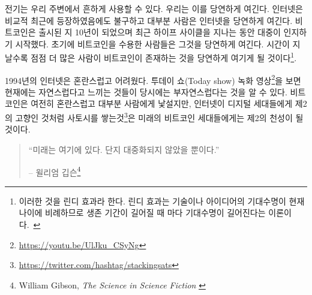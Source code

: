 \begin{comment}
Electricity has been around for a while now. We take it for granted. The
internet is quite a bit younger, but most people already take it for
granted as well. Bitcoin is ten years old and has entered public
consciousness during the last hype cycle. Only the earliest of adopters
take it for granted. As more time passes, more and more people will
recognize Bitcoin as something which simply is.\footnote{This is known as the
\textit{Lindy Effect}. The Lindy effect is a theory that the future life expectancy
of some non-perishable things like a technology or an idea is proportional to
their current age, so that every additional period of survival implies a longer
remaining life expectancy.~\cite{wiki:lindy}}
\end{comment}
전기는 우리 주변에서 흔하게 사용할 수 있다. 우리는 이를 당연하게 여긴다.
인터넷은 비교적 최근에 등장하였음에도 불구하고 대부분 사람은 인터넷을 당연하게 여긴다.
비트코인은 출시된 지 10년이 되었으며 최근 하이프 사이클을 지나는 동안 대중이 인지하기 시작했다.
초기에 비트코인을 수용한 사람들은 그것을 당연하게 여긴다. 
시간이 지날수록 점점 더 많은 사람이 비트코인이 존재하는 것을 당연하게 여기게 될 것이다\footnote{이러한 것을
	린디 효과라 한다. 린디 효과는 기술이나 아이디어의 기대수명이 현재 나이에 비례하므로 
	생존 기간이 길어질 때 마다 기대수명이 길어진다는 이론이다.~\cite{wiki:lindy}}.
	
\begin{comment}
In 1994, the internet was still confusing and unintuitive. Watching this old
recording of the \textit{Today
Show}\footnote{\url{https://youtu.be/UlJku_CSyNg}} makes it obvious that what
feels natural and intuitive now actually wasn't back then. Bitcoin is still
confusing and alien to most, but just like the internet is second nature for
digital natives, spending and stacking
sats\footnote{\url{https://twitter.com/hashtag/stackingsats}} will be second
nature to the bitcoin natives of the future.
\end{comment}
1994년의 인터넷은 혼란스럽고 어려웠다. 
투데이 쇼(Today show) 녹화 영상\footnote{\url{https://youtu.be/UlJku_CSyNg}}을 
보면 현재에는 자연스럽다고 느끼는 것들이 당시에는 부자연스럽다는 것을 알 수 있다.
비트코인은 여전히 혼란스럽고 대부분 사람에게 낯설지만, 
인터넷이 디지털 세대들에게 제2의 고향인 것처럼 사토시를 쌓는것\footnote{\url{https://twitter.com/hashtag/stackingsats}}은 미래의 비트코인 세대들에게는 제2의 천성이 될 것이다.

\begin{quotation}\begin{samepage}
\enquote{미래는 여기에 있다. 단지 대중화되지 않았을 뿐이다.}
\begin{flushright} -- 윌리엄 깁슨\footnote{William Gibson, \textit{The Science in Science Fiction} \cite{william-gibson}}
\end{flushright}\end{samepage}\end{quotation}


